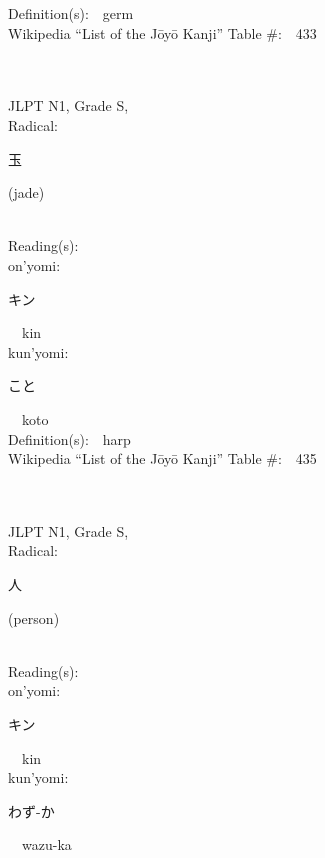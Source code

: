 \begin{multicols}{2}
Definition(s):\ \ germ \\
Wikipedia ``List of the J\=oy\=o Kanji'' Table \#:\ \ 433 \\
\ \ \\
{\fontsize{34pt}{40pt}  }\ \ \\
{JLPT N1, Grade S, \\Radical:\ \ {\begin{CJK}{UTF8}{min} 玉 \end{CJK}} (jade) } \\
Reading(s):\ \ \\
{\hspace*{1em}}on'yomi:\ \ \\
{\hspace*{2em}}{\begin{CJK}{UTF8}{min} キン \end{CJK}}\ \ kin\ \ \\
{\hspace*{1em}}kun'yomi:\ \ \\
{\hspace*{2em}}{\begin{CJK}{UTF8}{min} こと \end{CJK}}\ \ koto\ \ \\
Definition(s):\ \ harp \\
Wikipedia ``List of the J\=oy\=o Kanji'' Table \#:\ \ 435 \\
\ \ \\
{\fontsize{34pt}{40pt}  }\ \ \\
{JLPT N1, Grade S, \\Radical:\ \ {\begin{CJK}{UTF8}{min} 人 \end{CJK}} (person) } \\
Reading(s):\ \ \\
{\hspace*{1em}}on'yomi:\ \ \\
{\hspace*{2em}}{\begin{CJK}{UTF8}{min} キン \end{CJK}}\ \ kin\ \ \\
{\hspace*{1em}}kun'yomi:\ \ \\
{\hspace*{2em}}{\begin{CJK}{UTF8}{min} わず-か \end{CJK}}\ \ wazu-ka\ \ \\

\end{multicols}
